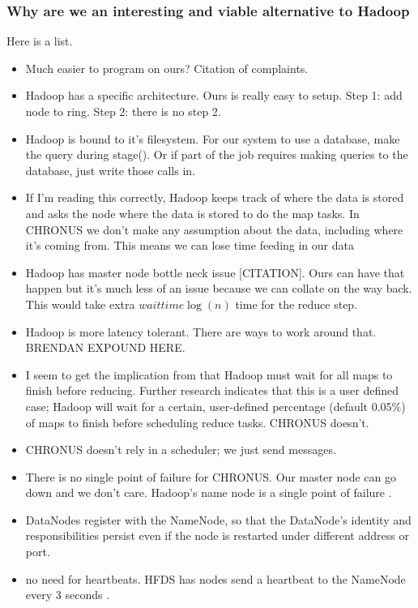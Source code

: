 \documentclass[conference, compsocconf, letterpaper]{IEEEtran}
\begin{document}
\subsubsection{Why are we an interesting and viable alternative to Hadoop}

Here is a list.

\begin{itemize}
    \item Much easier to program on ours? Citation of complaints.

    \item Hadoop has a specific architecture.  Ours is really easy to setup.  Step 1: add node to ring. Step 2: there is no step 2.

    \item Hadoop is bound to it's filesystem. For our system to use a database, make the query during stage().  Or if part of the job requires making queries to the database, just write those calls in.
    
    
    \item If I'm reading this correctly, Hadoop keeps track of where the data is stored and asks the node where the data is stored to do the map tasks.  In CHRONUS we don't make any assumption about the data, including where it's coming from.  This means we can lose time feeding in our data


    \item Hadoop has master node bottle neck issue [CITATION].  Ours can have that happen but it's much less of an issue because we can collate on the way back.   This would take extra  $waittime \log(n)$ time for the reduce step. 

    \item Hadoop is more latency tolerant.  There are ways to work around that.  BRENDAN EXPOUND HERE.

    \item I seem to get the implication from \cite{mrsurvey} that Hadoop must wait for all maps to finish before reducing.  Further research indicates that this is a user defined case; Hadoop will wait for a certain, user-defined percentage (default 0.05\%) of maps to finish before scheduling reduce tasks.  CHRONUS doesn't.
    
    \item CHRONUS doesn't rely in a scheduler; we just send messages.  

    \item There is no single point of failure for CHRONUS.  Our master node can go down and we don't care. Hadoop's name node is a single point of failure \cite{shvachko2010hadoop}.
    \item DataNodes register with the NameNode, so that the DataNode's identity and responsibilities persist even if the node is restarted under different address or port.
    
    \item no need for heartbeats.  HFDS has nodes send a heartbeat to the NameNode every 3 seconds \cite{shvachko2010hadoop}.  
\end{itemize}
\end{document}
